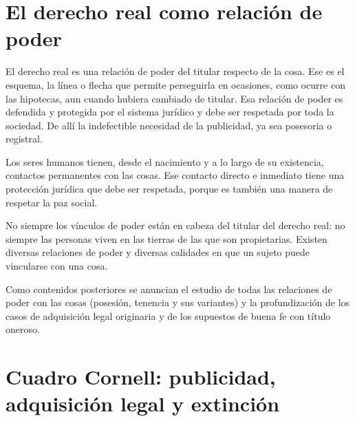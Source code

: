 \documentclass[12pt,oneside]{book}
\begin{document}
\section{El derecho real como relación de poder}

El derecho real es una relación de poder del titular respecto de la cosa. Ese es el esquema, la línea o flecha que permite perseguirla en ocasiones, como ocurre con las hipotecas, aun cuando hubiera cambiado de titular. Esa relación de poder es defendida y protegida por el sistema jurídico y debe ser respetada por toda la sociedad. De allí la indefectible necesidad de la publicidad, ya sea posesoria o registral.

Los seres humanos tienen, desde el nacimiento y a lo largo de su existencia, contactos permanentes con las cosas. Ese contacto directo e inmediato tiene una protección jurídica que debe ser respetada, porque es también una manera de respetar la paz social.

No siempre los vínculos de poder están en cabeza del titular del derecho real: no siempre las personas viven en las tierras de las que son propietarias. Existen diversas relaciones de poder y diversas calidades en que un sujeto puede vincularse con una cosa.

\begin{note}
Como contenidos posteriores se anuncian el estudio de todas las relaciones de poder con las cosas (posesión, tenencia y sus variantes) y la profundización de los casos de adquisición legal originaria y de los supuestos de buena fe con título oneroso.
\end{note}

\section{Cuadro Cornell: publicidad, adquisición legal y extinción}
\end{document}
